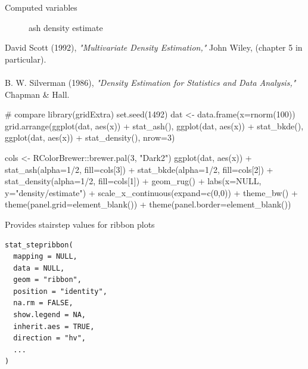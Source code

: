 \documentclass[a4paper]{book}
\begin{document}
%
\begin{Section}{Computed variables}

\begin{description}

\item[] ash density estimate

\end{description}

\end{Section}
%
\begin{References}
David Scott (1992), \emph{"Multivariate Density Estimation,"}
John Wiley, (chapter 5 in particular).\\{}
\\{}
B. W. Silverman (1986), \emph{"Density Estimation for Statistics
and Data Analysis,"} Chapman \& Hall.
\end{References}
%
\begin{Examples}
\begin{ExampleCode}
# compare
library(gridExtra)
set.seed(1492)
dat <- data.frame(x=rnorm(100))
grid.arrange(ggplot(dat, aes(x)) + stat_ash(),
             ggplot(dat, aes(x)) + stat_bkde(),
             ggplot(dat, aes(x)) + stat_density(),
             nrow=3)

cols <- RColorBrewer::brewer.pal(3, "Dark2")
ggplot(dat, aes(x)) +
  stat_ash(alpha=1/2, fill=cols[3]) +
  stat_bkde(alpha=1/2, fill=cols[2]) +
  stat_density(alpha=1/2, fill=cols[1]) +
  geom_rug() +
  labs(x=NULL, y="density/estimate") +
  scale_x_continuous(expand=c(0,0)) +
  theme_bw() +
  theme(panel.grid=element_blank()) +
  theme(panel.border=element_blank())
\end{ExampleCode}
\end{Examples}
%
\begin{Description}
Provides stairstep values for ribbon plots
\end{Description}
%
\begin{Usage}
\begin{verbatim}
stat_stepribbon(
  mapping = NULL,
  data = NULL,
  geom = "ribbon",
  position = "identity",
  na.rm = FALSE,
  show.legend = NA,
  inherit.aes = TRUE,
  direction = "hv",
  ...
)
\end{verbatim}
\end{Usage}
%
\end{document}
